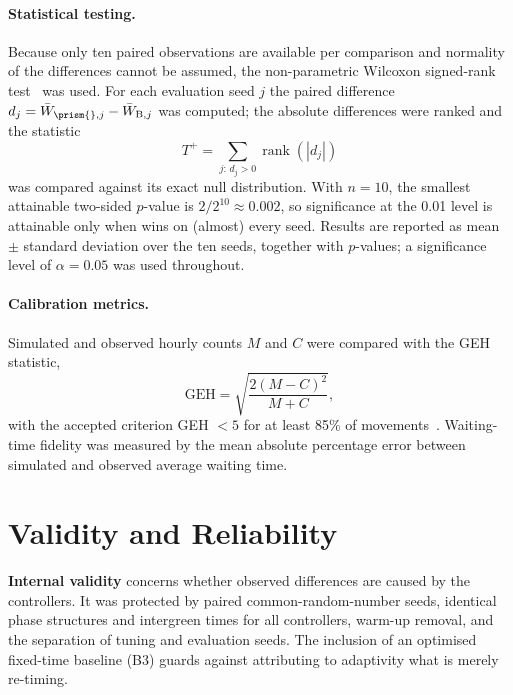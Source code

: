 \paragraph{Statistical testing.} Because only ten paired observations are available per comparison and normality of the differences cannot be assumed, the non-parametric Wilcoxon signed-rank test~\cite{wilcoxon1945} was used. For each evaluation seed $j$ the paired difference $d_j = \bar{W}_{\text{\prism{}},j} - \bar{W}_{\text{B},j}$ was computed; the absolute differences were ranked and the statistic
\begin{equation}
  T^{+} = \sum_{j:\, d_j > 0} \operatorname{rank}\left(|d_j|\right)
  \label{eq:wilcoxon}
\end{equation}
was compared against its exact null distribution. With $n = 10$, the smallest attainable two-sided $p$-value is $2/2^{10} \approx 0.002$, so significance at the 0.01 level is attainable only when \prism{} wins on (almost) every seed. Results are reported as mean $\pm$ standard deviation over the ten seeds, together with $p$-values; a significance level of $\alpha = 0.05$ was used throughout.

\paragraph{Calibration metrics.} Simulated and observed hourly counts $M$ and $C$ were compared with the GEH statistic,
\begin{equation}
  \mathrm{GEH} = \sqrt{\frac{2(M - C)^2}{M + C}} ,
  \label{eq:geh}
\end{equation}
with the accepted criterion GEH $< 5$ for at least 85\% of movements~\cite{dowling2004toolbox}. Waiting-time fidelity was measured by the mean absolute percentage error between simulated and observed average waiting time.

\section{Validity and Reliability}\label{sec:method-validity}

\textbf{Internal validity} concerns whether observed differences are caused by the controllers. It was protected by paired common-random-number seeds, identical phase structures and intergreen times for all controllers, warm-up removal, and the separation of tuning and evaluation seeds. The inclusion of an optimised fixed-time baseline (B3) guards against attributing to adaptivity what is merely re-timing.

